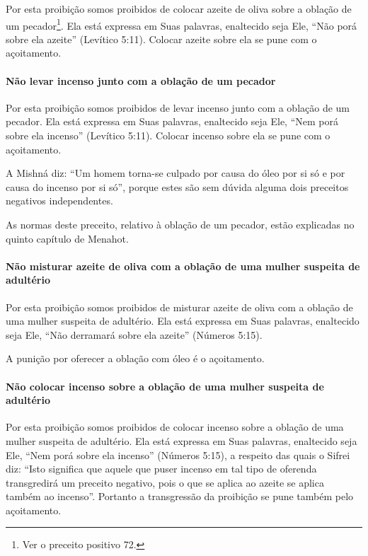 Por esta proibição somos proibidos de colocar azeite de oliva sobre a
oblação de um pecador\footnote{Ver o preceito positivo 72.}. Ela está expressa em Suas
palavras, enaltecido seja Ele, ``Não porá sobre ela azeite'' (Levítico
5:11). Colocar azeite sobre ela se pune com o açoitamento.

\paragraph{Não levar incenso junto com a oblação de um pecador}

Por esta proibição somos proibidos de levar incenso junto com a oblação
de um pecador. Ela está expressa em Suas palavras, enaltecido seja Ele,
``Nem porá sobre ela incenso'' (Levítico 5:11). Colocar incenso sobre
ela se pune com o açoitamento.

A Mishná diz: ``Um homem torna-se culpado por causa do óleo por si só e
por causa do incenso por si só'', porque estes são sem dúvida alguma
dois preceitos negativos independentes.

As normas deste preceito, relativo à oblação de um pecador, estão
explicadas no quinto capítulo de Menahot.

\paragraph{Não misturar azeite de oliva com a oblação de uma mulher suspeita de
adultério}

Por esta proibição somos proibidos de misturar azeite de oliva com a
oblação de uma mulher suspeita de adultério. Ela está expressa em Suas
palavras, enaltecido seja Ele, ``Não derramará sobre ela azeite''
(Números 5:15).

A punição por oferecer a oblação com óleo é o açoitamento.

\paragraph{Não colocar incenso sobre a oblação de uma mulher suspeita de adultério}

Por esta proibição somos proibidos de colocar incenso sobre a oblação
de uma mulher suspeita de adultério. Ela está expressa em Suas palavras,
enaltecido seja Ele, ``Nem porá sobre ela incenso'' (Números 5:15), a
respeito das quais o Sifrei diz: ``Isto significa que aquele que puser
incenso em tal tipo de oferenda transgredirá um preceito negativo, pois
o que se aplica ao azeite se aplica também ao incenso''. Portanto a
transgressão da proibição se pune também pelo açoitamento.

